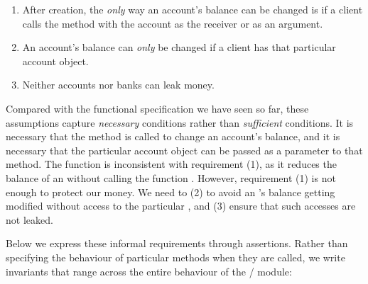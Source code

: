 \begin{enumerate}
\item After creation, the \emph{only} way an account's
  balance can be changed is if a client   calls the  method  with the
  account as the receiver or as an argument. 
\item An account's balance can \emph{only} be changed if a client has
  that particular account object.
\item Neither accounts nor banks can leak money.   
\end{enumerate}

Compared with the functional specification we have seen so far, these
assumptions capture \emph{necessary} conditions rather than
\emph{sufficient} conditions. It is necessary that the 
method is called to change an account's balance, and it is necessary
that the particular account object can be passed as a parameter to
that method. The  function 
 is inconsistent with requirement  (1), as it reduces the balance of an  without calling the
function . 
However, requirement  (1) is not enough to protect our money. We need to (2) to avoid an 's balance getting
modified without access to the particular , and (3) ensure that such accesses are not leaked. 


 
Below we  express these  informal requirements  %
through \Chainmail assertions.  Rather than %
specifying the behaviour of particular methods when they are called, we
write  invariants   that range across the entire behaviour of the
/  module:
\vspace{.2cm}

